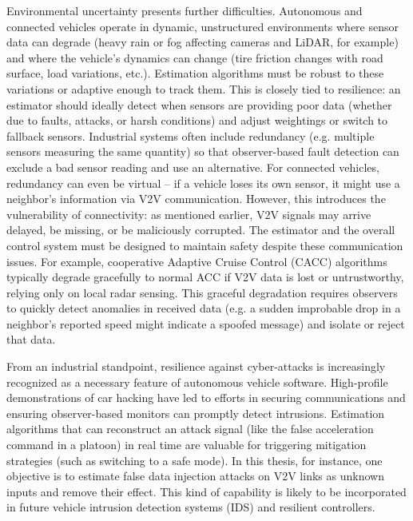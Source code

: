 Environmental uncertainty presents further difficulties. Autonomous and connected vehicles operate in dynamic, unstructured environments where sensor data can degrade (heavy rain or fog affecting cameras and LiDAR, for example) and where the vehicle’s dynamics can change (tire friction changes with road surface, load variations, etc.). Estimation algorithms must be robust to these variations or adaptive enough to track them. This is closely tied to resilience: an estimator should ideally detect when sensors are providing poor data (whether due to faults, attacks, or harsh conditions) and adjust weightings or switch to fallback sensors. Industrial systems often include redundancy (e.g. multiple sensors measuring the same quantity) so that observer-based fault detection can exclude a bad sensor reading and use an alternative. For connected vehicles, redundancy can even be virtual – if a vehicle loses its own sensor, it might use a neighbor’s information via V2V communication. However, this introduces the vulnerability of connectivity: as mentioned earlier, V2V signals may arrive delayed, be missing, or be maliciously corrupted. The estimator and the overall control system must be designed to maintain safety despite these communication issues. For example, cooperative Adaptive Cruise Control (CACC) algorithms typically degrade gracefully to normal ACC if V2V data is lost or untrustworthy, relying only on local radar sensing. This graceful degradation requires observers to quickly detect anomalies in received data (e.g. a sudden improbable drop in a neighbor’s reported speed might indicate a spoofed message) and isolate or reject that data.

From an industrial standpoint, resilience against cyber-attacks is increasingly recognized as a necessary feature of autonomous vehicle software. High-profile demonstrations of car hacking have led to efforts in securing communications and ensuring observer-based monitors can promptly detect intrusions. Estimation algorithms that can reconstruct an attack signal (like the false acceleration command in a platoon) in real time are valuable for triggering mitigation strategies (such as switching to a safe mode). In this thesis, for instance, one objective is to estimate false data injection attacks on V2V links as unknown inputs and remove their effect. This kind of capability is likely to be incorporated in future vehicle intrusion detection systems (IDS) and resilient controllers.

